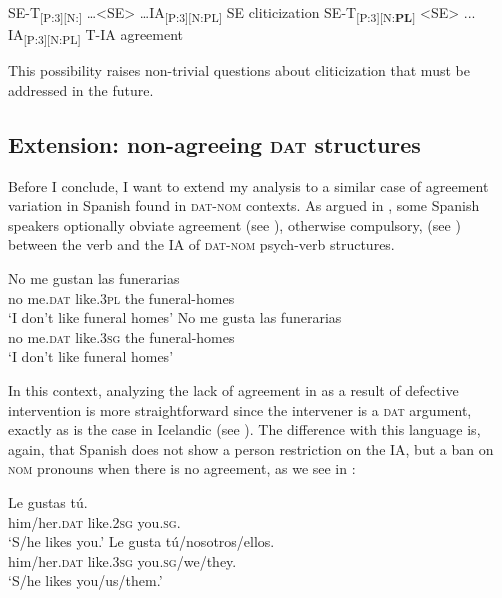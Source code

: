 \documentclass[output=paper,colorlinks,citecolor=brown]{langscibook}
\begin{document}
\begin{exe}
	 \ex \label{ex:05:clitic}
	 \begin{xlisti}
		\ex  SE-T\textsubscript{[P:3][N:]} \dots <SE> \dots IA\textsubscript{[P:3][N:PL]} \hfill SE cliticization
		\ex SE-T\textsubscript{[P:3][N:\textbf{PL}]}  <SE>  ... IA\textsubscript{[P:3][N:PL]} \hfill T-IA agreement
	\end{xlisti}
\end{exe}

This possibility raises non-trivial questions about cliticization that must be addressed in the future.

\subsection{Extension: non-agreeing \textsc{dat} structures}

Before I conclude, I want to extend my analysis to a similar case of agreement variation in Spanish found in \textsc{dat}-\textsc{nom} contexts. As argued in \citet{Arias_Fernandez2020}, some Spanish speakers optionally obviate agreement (see ), otherwise compulsory, (see ) between the verb and the IA of \textsc{dat}-\textsc{nom} psych-verb structures.

\ea \label{ex:05:DPV}
\ea \label{ex:05:DPVa}
        \gll No me gustan las funerarias  \\
            no me.\textsc{dat} like.\textsc{3pl} the funeral-homes \\
        \glt `I don't like funeral homes'
\ex \label{ex:05:DPVb}
        \gll No me gusta las funerarias  \\
            no me.\textsc{dat} like.\textsc{3sg} the funeral-homes \\
        \glt `I don't like funeral homes'
\z \z

In this context, analyzing the lack of agreement in  as a result of defective intervention is more straightforward since the intervener is a \textsc{dat} argument, exactly as is the case in Icelandic (see ). The difference with this language is, again, that Spanish does not show a person restriction on the IA, but a ban on \textsc{nom} pronouns when there is no agreement, as we see in :

\ea \label{ex:05:DATPR}
    \ea \label{ex:05:DATPRa}
        \gll Le gustas tú. \\
         him/her.\textsc{dat} like.\textsc{2sg} you.\textsc{sg}. \\
        \glt `S/he likes you.'
    \ex \label{ex:05:DATPRb}
        \gll {*}Le gusta tú/nosotros/ellos. \\
         { }him/her.\textsc{dat} like.\textsc{3sg} you.\textsc{sg}/we/they. \\
        \glt `S/he likes you/us/them.'
\z\z
\end{document}
